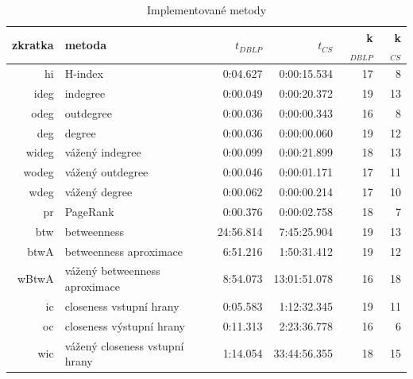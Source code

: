 \documentclass{bakalarka}
\begin{document}
\begin{table}[!ht]
\centering
\caption{Implementované metody}
\label{tab:impmetody}
\begin{small}
\begin{tabular}{r|l|r|r|r|r}
\toprule
zkratka & metoda & $t_{DBLP}$ & $t_{CS}$ & k$_{DBLP}$ & k$_{CS}$ \\
\midrule
hi   &H-index                           & 0:04.627& 0:00:15.534&17&8\\
ideg &indegree                          & 0:00.049& 0:00:20.372&19&13\\
odeg &outdegree                         & 0:00.036& 0:00:00.343&16&8\\
deg  &degree                            & 0:00.036& 0:00:00.060&19&12\\
wideg&vážený indegree                   & 0:00.099& 0:00:21.899&18&13\\
wodeg&vážený outdegree                  & 0:00.046& 0:00:01.171&17&11\\
wdeg &vážený degree                     & 0:00.062& 0:00:00.214&17&10\\
pr   &PageRank                          & 0:00.376& 0:00:02.758&18&7\\
btw  &betweenness                       &24:56.814& 7:45:25.904&19&13\\
btwA &betweenness aproximace            & 6:51.216& 1:50:31.412&19&12\\
wBtwA&vážený betweenness aproximace     & 8:54.073&13:01:51.078&16&18\\
ic   &closeness vstupní hrany           & 0:05.583& 1:12:32.345&19&11\\
oc   &closeness výstupní hrany          & 0:11.313& 2:23:36.778&16&6\\
wic  &vážený closeness vstupní hrany    & 1:14.054&33:44:56.355&18&15\\
\bottomrule
\end{tabular}
\end{small}
\end{table}


\end{document}
